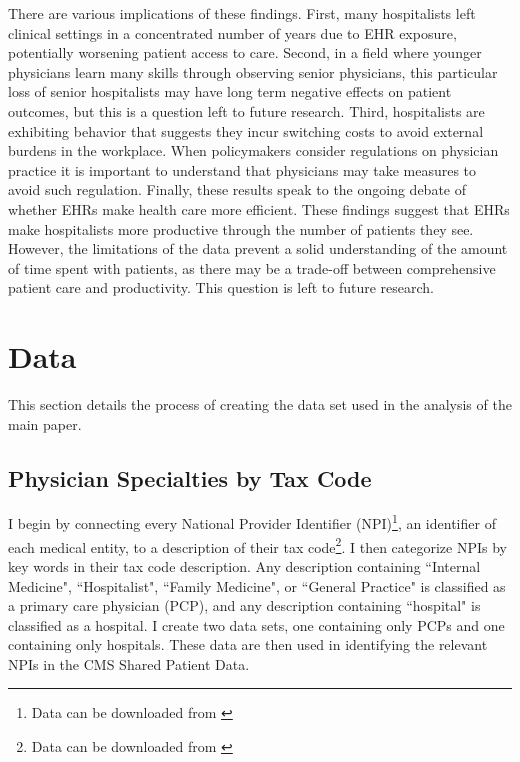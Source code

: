 \documentclass[12pt]{article}
\begin{document}
There are various implications of these findings. First, many hospitalists left clinical settings in a concentrated number of years due to EHR exposure, potentially worsening patient access to care. Second, in a field where younger physicians learn many skills through observing senior physicians, this particular loss of senior hospitalists may have long term negative effects on patient outcomes, but this is a question left to future research. Third, hospitalists are exhibiting behavior that suggests they incur switching costs to avoid external burdens in the workplace. When policymakers consider regulations on physician practice it is important to understand that physicians may take measures to avoid such regulation. Finally, these results speak to the ongoing debate of whether EHRs make health care more efficient. These findings suggest that EHRs make hospitalists more productive through the number of patients they see. However, the limitations of the data prevent a solid understanding of the amount of time spent with patients, as there may be a trade-off between comprehensive patient care and productivity. This question is left to future research.  
 




\clearpage
\onehalfspacing

\printbibliography

\clearpage


\appendix

\section{Data}\label{app:data}

This section details the process of creating the data set used in the analysis of the main paper. 

\subsection{Physician Specialties by Tax Code}\label{sec:taxcode}

I begin by connecting every National Provider Identifier (NPI)\footnote{Data can be downloaded from \hyperlink{https://download.cms.gov/nppes/NPI/Files.html}{}}, an identifier of each medical entity, to a description of their tax code\footnote{Data can be downloaded from \hyperlink{https://nucc.org/index.php/code-sets-mainmenu-41/provider-taxonomy-mainmenu-40/pdf-mainmenu-53}{}}. I then categorize NPIs by key words in their tax code description. Any description containing ``Internal Medicine", ``Hospitalist", ``Family Medicine", or ``General Practice" is classified as a primary care physician (PCP), and any description containing ``hospital" is classified as a hospital. I create two data sets, one containing only PCPs and one containing only hospitals. These data are then used in identifying the relevant NPIs in the CMS Shared Patient Data. 
\end{document}
